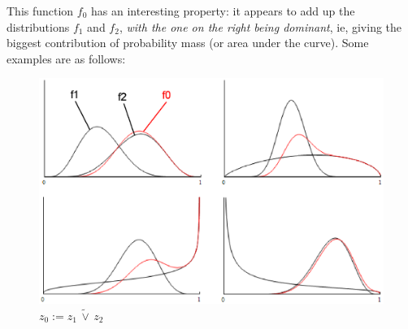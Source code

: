 \documentclass[a4paper]{report}
\begin{document}

This function $f_0$ has an interesting property:  it appears to add up the distributions $f_1$ and $f_2$, \textit{with the one on the right being dominant}, ie, giving the biggest contribution of probability mass (or area under the curve).  Some examples are as follows:
\begin{figure}[H]
\centering
\includegraphics[scale=0.8]{A-ZOR-B-examples.ps}
\caption{$z_0 := z_1 \, \widetilde{\vee} \, z_2$}
\end{figure}

\end{document}
